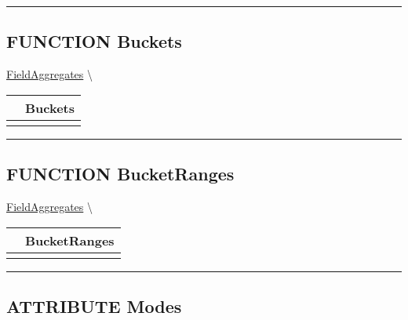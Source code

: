 \par


\rule{\linewidth}{0.5pt}
\subsection*{\textsf{\colorbox{headtoc}{\color{white} FUNCTION}
Buckets}}

\hypertarget{ecldoc:ml_core.fieldaggregates.buckets}{}
\hspace{0pt} \hyperlink{ecldoc:ml_core.fieldaggregates}{FieldAggregates} \textbackslash 

{\renewcommand{\arraystretch}{1.5}
\begin{tabularx}{\textwidth}{|>{\raggedright\arraybackslash}l|X|}
\hline
\hspace{0pt}\mytexttt{\color{red} } & \textbf{Buckets} \\
\hline
\multicolumn{2}{|>{\raggedright\arraybackslash}X|}{\hspace{0pt}\mytexttt{\color{param} (Types.t\_Discrete n)}} \\
\hline
\end{tabularx}
}

\par


\rule{\linewidth}{0.5pt}
\subsection*{\textsf{\colorbox{headtoc}{\color{white} FUNCTION}
BucketRanges}}

\hypertarget{ecldoc:ml_core.fieldaggregates.bucketranges}{}
\hspace{0pt} \hyperlink{ecldoc:ml_core.fieldaggregates}{FieldAggregates} \textbackslash 

{\renewcommand{\arraystretch}{1.5}
\begin{tabularx}{\textwidth}{|>{\raggedright\arraybackslash}l|X|}
\hline
\hspace{0pt}\mytexttt{\color{red} } & \textbf{BucketRanges} \\
\hline
\multicolumn{2}{|>{\raggedright\arraybackslash}X|}{\hspace{0pt}\mytexttt{\color{param} (Types.t\_Discrete n)}} \\
\hline
\end{tabularx}
}

\par


\rule{\linewidth}{0.5pt}
\subsection*{\textsf{\colorbox{headtoc}{\color{white} ATTRIBUTE}
Modes}}

